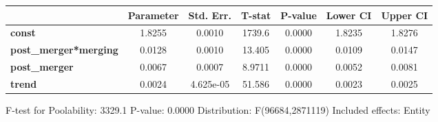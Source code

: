 \documentclass{report}
\begin{document}
\begin{center}
\begin{tabular}{lcccccc}
                              & \textbf{Parameter} & \textbf{Std. Err.} & \textbf{T-stat} & \textbf{P-value} & \textbf{Lower CI} & \textbf{Upper CI}  \\
\midrule
\textbf{const}                &       1.8255       &       0.0010       &      1739.6     &      0.0000      &       1.8235      &       1.8276       \\
\textbf{post\_merger*merging} &       0.0128       &       0.0010       &      13.405     &      0.0000      &       0.0109      &       0.0147       \\
\textbf{post\_merger}         &       0.0067       &       0.0007       &      8.9711     &      0.0000      &       0.0052      &       0.0081       \\
\textbf{trend}                &       0.0024       &     4.625e-05      &      51.586     &      0.0000      &       0.0023      &       0.0025       \\
\bottomrule
\end{tabular}
\end{center}

F-test for Poolability: 3329.1 \newline
 P-value: 0.0000 \newline
 Distribution: F(96684,2871119) \newline
  \newline
 Included effects: Entity
\end{document}
